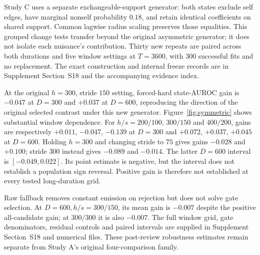 Study C uses a separate exchangeable-support generator: both states exclude
self edges, have marginal nonself probability $0.18$, and retain identical
coefficients on shared support. Common lagwise radius scaling preserves
those equalities. This grouped change tests transfer beyond the original
asymmetric generator; it does not isolate each nuisance's contribution.
Thirty new repeats are paired across both durations and five window settings
at $T=3600$, with $300$ successful fits and no replacement.
The exact construction and internal freeze records are in Supplement
Section~S18 and the accompanying evidence index.

At the original $h=300$, stride $150$ setting, forced-hard state-AUROC gain
is $-0.047$ at $D=300$ and $+0.037$ at $D=600$, reproducing the direction
of the original selected contrast under this new generator.
Figure~\ref{fig:symmetric} shows substantial window dependence. For
$h/s=200/100$, $300/150$ and $400/200$, gains are respectively
$+0.011$, $-0.047$, $-0.139$ at $D=300$ and
$+0.072$, $+0.037$, $+0.045$ at $D=600$.
Holding $h=300$ and changing stride to $75$ gives gains $-0.028$ and
$+0.100$; stride $300$ instead gives $-0.089$ and $-0.014$.
The latter $D=600$ interval is $[-0.049,0.022]$. Its point estimate is
negative, but the interval does not establish a population sign reversal.
Positive gain is therefore not established at every tested long-duration grid.

Raw fallback removes constant emission on rejection but does not solve gate
selection. At $D=600,h/s=300/150$, its mean gain is $-0.007$ despite the
positive all-candidate gain; at $300/300$ it is also $-0.007$.
The full window grid, gate denominators, residual controls and paired
intervals are supplied in Supplement Section~S18 and numerical files.
These post-review robustness estimates remain separate from Study A's
original four-comparison family.
